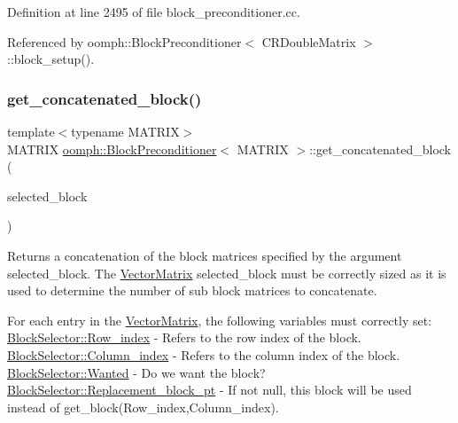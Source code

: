Definition at line 2495 of file block\+\_\+preconditioner.\+cc.



Referenced by oomph\+::\+Block\+Preconditioner$<$ C\+R\+Double\+Matrix $>$\+::block\+\_\+setup().

\mbox{\label{classoomph_1_1BlockPreconditioner_a51636746e5921ee2845daf60b1c322dc}} 
\subsubsection{\texorpdfstring{get\+\_\+concatenated\+\_\+block()}{get\_concatenated\_block()}}
{\footnotesize\ttfamily template$<$typename M\+A\+T\+R\+IX$>$ \\
M\+A\+T\+R\+IX \hyperlink{classoomph_1_1BlockPreconditioner}{oomph\+::\+Block\+Preconditioner}$<$ M\+A\+T\+R\+IX $>$\+::get\+\_\+concatenated\+\_\+block (\begin{DoxyParamCaption}\item[{const \hyperlink{classoomph_1_1VectorMatrix}{Vector\+Matrix}$<$ \hyperlink{classoomph_1_1BlockSelector}{Block\+Selector} $>$ \&}]{selected\+\_\+block }\end{DoxyParamCaption})\hspace{0.3cm}{\ttfamily [inline]}}



Returns a concatenation of the block matrices specified by the argument selected\+\_\+block. The \hyperlink{classoomph_1_1VectorMatrix}{Vector\+Matrix} selected\+\_\+block must be correctly sized as it is used to determine the number of sub block matrices to concatenate. 

For each entry in the \hyperlink{classoomph_1_1VectorMatrix}{Vector\+Matrix}, the following variables must correctly set\+: \hyperlink{classoomph_1_1BlockSelector_ae48060783b1f4744b14a4477190e205e}{Block\+Selector\+::\+Row\+\_\+index} -\/ Refers to the row index of the block. \hyperlink{classoomph_1_1BlockSelector_adac07173a35f4f7f28e67b4b62306777}{Block\+Selector\+::\+Column\+\_\+index} -\/ Refers to the column index of the block. \hyperlink{classoomph_1_1BlockSelector_ad5b7ec23096f89f3d0cceed70ca07fdb}{Block\+Selector\+::\+Wanted} -\/ Do we want the block? \hyperlink{classoomph_1_1BlockSelector_ad18ae2223ddfb1a1b61937930357bfc8}{Block\+Selector\+::\+Replacement\+\_\+block\+\_\+pt} -\/ If not null, this block will be used instead of get\+\_\+block(\+Row\+\_\+index,\+Column\+\_\+index).

